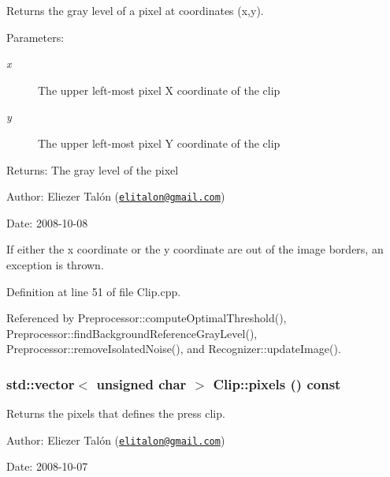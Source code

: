 Returns the gray level of a pixel at coordinates (x,y). 

\begin{Desc}
\item[Parameters:]
\begin{description}
\item[{\em x}]The upper left-most pixel X coordinate of the clip \item[{\em y}]The upper left-most pixel Y coordinate of the clip\end{description}
\end{Desc}
\begin{Desc}
\item[Returns:]The gray level of the pixel\end{Desc}
\begin{Desc}
\item[Author:]Eliezer Talón (\href{mailto:elitalon@gmail.com}{\tt elitalon@gmail.com}) \end{Desc}
\begin{Desc}
\item[Date:]2008-10-08\end{Desc}
If either the x coordinate or the y coordinate are out of the image borders, an exception is thrown. 

Definition at line 51 of file Clip.cpp.

Referenced by Preprocessor::computeOptimalThreshold(), Preprocessor::findBackgroundReferenceGrayLevel(), Preprocessor::removeIsolatedNoise(), and Recognizer::updateImage().\hypertarget{class_clip_c41089906750f03863854504db8f7e5c}{
\subsubsection[pixels]{\setlength{\rightskip}{0pt plus 5cm}std::vector$<$ unsigned char $>$ Clip::pixels () const}}
\label{class_clip_c41089906750f03863854504db8f7e5c}


Returns the pixels that defines the press clip. 

\begin{Desc}
\item[Author:]Eliezer Talón (\href{mailto:elitalon@gmail.com}{\tt elitalon@gmail.com}) \end{Desc}
\begin{Desc}
\item[Date:]2008-10-07 \end{Desc}



